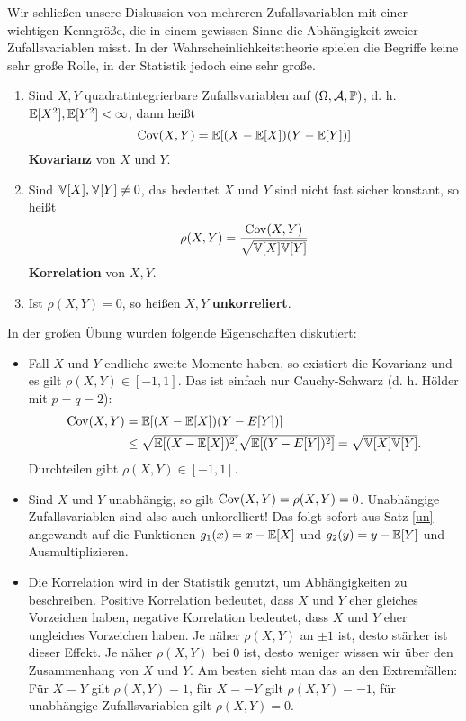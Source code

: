 Wir schlie\ss en unsere Diskussion von mehreren Zufallsvariablen mit einer wichtigen Kenngr\"o\ss e, die in einem gewissen Sinne die Abh\"angigkeit zweier Zufallsvariablen misst. In der Wahrscheinlichkeitstheorie spielen die Begriffe keine sehr gro\ss e Rolle, in der Statistik jedoch eine sehr gro\ss e.
\begin{deff} \abs

	\begin{enumerate}[label=(\roman*)]
		\item Sind $X,Y$ quadratintegrierbare Zufallsvariablen auf $(\Omega, \mathcal{A}, \mathbb{P})$, d. h. $\mathbb{E}[X^2],\mathbb{E}[Y^2] < \infty$, dann heißt 
		$$\operatorname{Cov}(X,Y) = \mathbb{E}[(X - \mathbb{E}[X])(Y - \mathbb{E}[Y])]$$ \textbf{Kovarianz} von $X$ und $Y$.
		\item Sind $\mathbb{V}[X], \mathbb{V}[Y] \neq 0$, das bedeutet $X$ und $Y$ sind nicht fast sicher konstant, so heißt \[ \rho(X,Y) = \frac{\operatorname{Cov}(X,Y)}{\sqrt{\mathbb{V}[X]\mathbb{V}[Y]}} \] \textbf{Korrelation} von $X, Y$.
		\item Ist $\rho(X,Y) = 0$, so heißen $X,Y$ \textbf{unkorreliert}.
	\end{enumerate} 
\end{deff}
In der gro\ss en \"Ubung wurden folgende Eigenschaften diskutiert:
\begin{bem} \abs

\begin{itemize}
	\item Fall $X$ und $Y$ endliche zweite Momente haben, so existiert die Kovarianz und es gilt $\rho(X,Y)\in [-1,1]$. Das ist einfach nur Cauchy-Schwarz (d. h. H\"older mit $p=q=2$):
	\begin{align*}
		\operatorname{Cov}(X,Y)&= \mathbb{E}[(X - \mathbb{E}[X])(Y - E[Y])]\\
		&\leq  \sqrt{\mathbb{E}[(X - \mathbb{E}[X])^2]} \sqrt{ \mathbb{E}[(Y - E[Y])^2]}=\sqrt{\mathbb{V}[X]\mathbb{V}[Y]}.
	\end{align*}
	Durchteilen gibt $\rho(X,Y)\in [-1,1]$.
	\item Sind $X$ und $Y$ unabh\"angig, so gilt $\operatorname{Cov}(X,Y)=\rho(X,Y)=0$. Unabh\"angige Zufallsvariablen sind also auch unkorelliert! Das folgt sofort aus Satz \ref{un} angewandt auf die Funktionen $g_1(x)=x-\mathbb{E}[X]$ und $g_2(y)=y-\mathbb{E}[Y]$ und Ausmultiplizieren.
	\item Die Korrelation wird in der Statistik genutzt, um Abh\"angigkeiten zu beschreiben. Positive Korrelation bedeutet, dass $X$ und $Y$ eher gleiches Vorzeichen haben, negative Korrelation bedeutet, dass $X$ und $Y$ eher ungleiches Vorzeichen haben. Je n\"aher $\rho(X,Y)$ an $\pm 1$ ist, desto st\"arker ist dieser Effekt. Je n\"aher $\rho(X,Y)$ bei $0$ ist, desto weniger wissen wir \"uber den Zusammenhang von $X$ und $Y$. Am besten sieht man das an den Extremf\"allen: F\"ur $X=Y$ gilt $\rho(X,Y)=1$, f\"ur $X=-Y$ gilt $\rho(X,Y)=-1$, f\"ur unabh\"angige Zufallsvariablen gilt $\rho(X,Y)=0$.
\end{itemize}
\end{bem}


